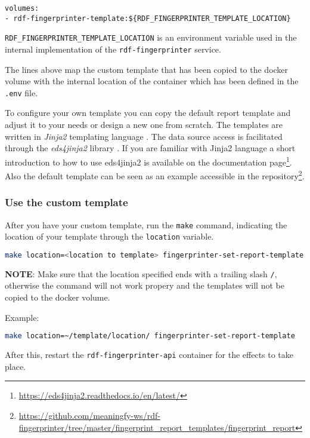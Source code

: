 		\begin{lstlisting}[]
volumes:
- rdf-fingerprinter-template:${RDF_FINGERPRINTER_TEMPLATE_LOCATION}
		\end{lstlisting}

		\texttt{RDF\_FINGERPRINTER\_TEMPLATE\_LOCATION} is an environment variable used in the internal implementation of the \texttt{rdf-fingerprinter} service.

		The lines above map the custom template that has been copied to the docker volume with the internal location of the container which has been defined in the \texttt{.env} file.

		To configure your own template you can copy the default report template and adjust it to your needs or design a new one from scratch. 
		The templates are written in \textit{Jinja2} templating language \citep{jinja2}. The data source access is facilitated through the \textit{eds4jinja2} library \citep{eds4jinja2}. If you are familiar with Jinja2 language a short introduction to how to use eds4jinja2 is available on the documentation page\footnote{\url{https://eds4jinja2.readthedocs.io/en/latest/}}. Also the default template can be seen as an example accessible in the repository\footnote{\url{https://github.com/meaningfy-ws/rdf-fingerprinter/tree/master/fingerprint_report_templates/fingerprint_report}}.

		\subsubsection{Use the custom template}
		After you have your custom template, run the \texttt{make} command, indicating the location of your template through the \texttt{location} variable.
		\begin{lstlisting}[language=bash]
make location=<location to template> fingerprinter-set-report-template
		\end{lstlisting}

		\textbf{NOTE}: Make sure that the location specified ends with a trailing slash \texttt{/}, otherwise the command will not work propery and the templates will not be copied to the docker volume.

		Example:
		\begin{lstlisting}[language=bash]
make location=~/template/location/ fingerprinter-set-report-template
		\end{lstlisting}

		After this, restart the \texttt{rdf-fingerprinter-api} container for the effects to take place.


